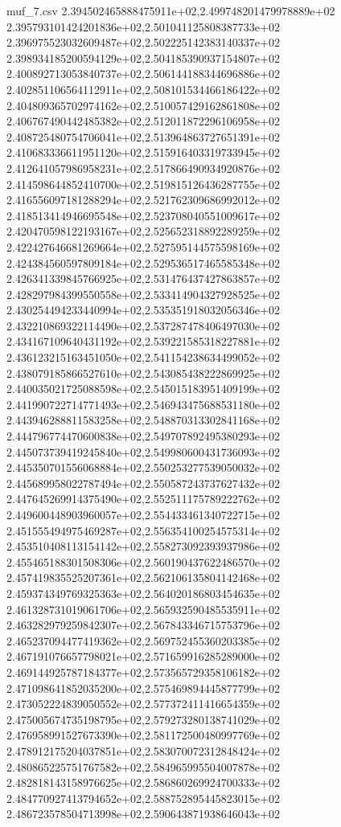 \begin{filecontents*}{muf_7.csv}
2.394502465888475911e+02,2.499748201479978889e+02
2.395793101424201836e+02,2.501041125808387733e+02
2.396975523032609487e+02,2.502225142383140337e+02
2.398934185200594129e+02,2.504185390937154807e+02
2.400892713053840737e+02,2.506144188344696886e+02
2.402851106564112911e+02,2.508101534466186422e+02
2.404809365702974162e+02,2.510057429162861808e+02
2.406767490442485382e+02,2.512011872296106958e+02
2.408725480754706041e+02,2.513964863727651391e+02
2.410683336611951120e+02,2.515916403319733945e+02
2.412641057986958231e+02,2.517866490934920876e+02
2.414598644852410700e+02,2.519815126436287755e+02
2.416556097181288294e+02,2.521762309686992012e+02
2.418513414946695548e+02,2.523708040551009617e+02
2.420470598122193167e+02,2.525652318892289259e+02
2.422427646681269664e+02,2.527595144575598169e+02
2.424384560597809184e+02,2.529536517465585348e+02
2.426341339845766925e+02,2.531476437427863857e+02
2.428297984399550558e+02,2.533414904327928525e+02
2.430254494233440994e+02,2.535351918032056346e+02
2.432210869322114490e+02,2.537287478406497030e+02
2.434167109640431192e+02,2.539221585318227881e+02
2.436123215163451050e+02,2.541154238634499052e+02
2.438079185866527610e+02,2.543085438222869925e+02
2.440035021725088598e+02,2.545015183951409199e+02
2.441990722714771493e+02,2.546943475688531180e+02
2.443946288811583258e+02,2.548870313302841168e+02
2.444796774470600838e+02,2.549707892495380293e+02
2.445073739419245840e+02,2.549980600431736093e+02
2.445350701556068884e+02,2.550253277539050032e+02
2.445689958022787494e+02,2.550587243737627432e+02
2.447645269914375490e+02,2.552511175789222762e+02
2.449600448903960057e+02,2.554433461340722715e+02
2.451555494975469287e+02,2.556354100254575314e+02
2.453510408113154142e+02,2.558273092393937986e+02
2.455465188301508306e+02,2.560190437622486570e+02
2.457419835525207361e+02,2.562106135804142468e+02
2.459374349769325363e+02,2.564020186803454635e+02
2.461328731019061706e+02,2.565932590485535911e+02
2.463282979259842307e+02,2.567843346715753796e+02
2.465237094477419362e+02,2.569752455360203385e+02
2.467191076657798021e+02,2.571659916285289000e+02
2.469144925787184377e+02,2.573565729358106182e+02
2.471098641852035200e+02,2.575469894445877799e+02
2.473052224839050552e+02,2.577372411416654359e+02
2.475005674735198795e+02,2.579273280138741029e+02
2.476958991527673390e+02,2.581172500480997769e+02
2.478912175204037851e+02,2.583070072312848424e+02
2.480865225751767582e+02,2.584965995504007878e+02
2.482818143158976625e+02,2.586860269924700333e+02
2.484770927413794652e+02,2.588752895445823015e+02
2.486723578504713998e+02,2.590643871938646043e+02

\end{filecontents*}

